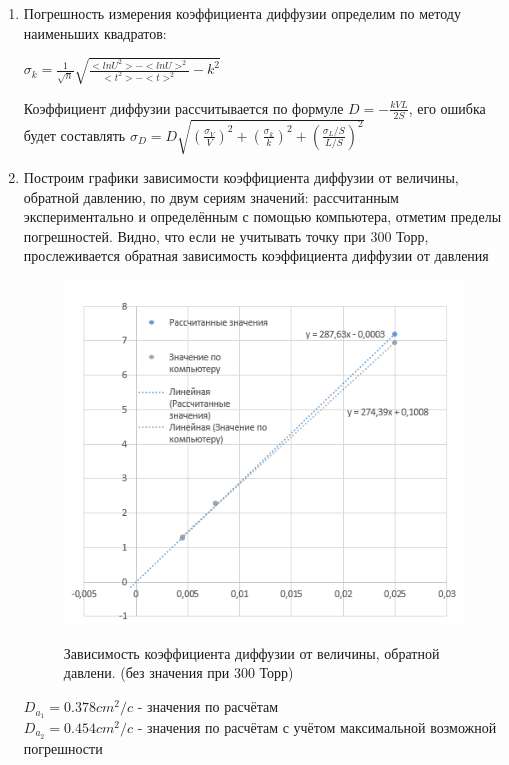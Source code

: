 \documentclass[12pt,a4paper]{article}
\begin{document}
\begin{enumerate}
\item Погрешность измерения коэффициента диффузии определим по методу наименьших квадратов:
\begin{center}
$\sigma_k = \frac{1}{\sqrt{n}}\sqrt{\frac{<ln U^2>-<ln U>^2}{<t^2>-<t>^2}-k^2}$
\end{center}

Коэффициент диффузии рассчитывается по формуле $D = -\frac{kVL}{2S}$, его ошибка будет составлять $\sigma_D = D\sqrt{(\frac{\sigma_V}{V})^2+(\frac{\sigma_k}{k})^2+(\frac{\sigma_L/S}{L/S})^2}$


\item Построим графики зависимости коэффициента диффузии от величины, обратной давлению, по двум сериям значений: рассчитанным экспериментально и определённым с помощью компьютера, отметим пределы погрешностей. Видно, что если не учитывать точку при 300 Торр, прослеживается обратная зависимость коэффициента диффузии от давления
\begin{figure}[h]
    \centering
    \begin{center}
    \caption{Зависимость коэффициента диффузии от величины, обратной давлени. (без значения при 300 Торр)}
    \end{center}
    \includegraphics[width=10 cm]{atm.PNG}
    \label{fig:vac}
\end{figure} 

\begin{center}
$D_{a_{1}} = 0.378 cm^2/c$ - значения по расчётам\\
$D_{a_{2}} = 0.454 cm^2/c$ - значения по расчётам с учётом максимальной возможной погрешности\\
\end{center}


\end{enumerate}
\end{document}

